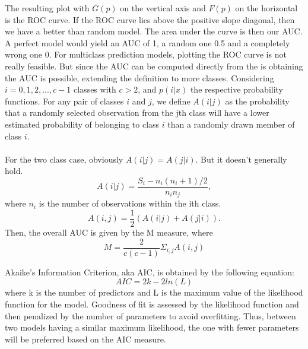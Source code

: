     The resulting plot with $G(p)$ on the vertical axis and $F(p)$ on 
    the horizontal is the ROC curve. If the ROC curve lies above the 
    positive slope diagonal, then we have a better than random model. 
    The area under the curve is then our AUC. A perfect model would 
    yield an AUC of 1, a random one 0.5 and a completely wrong one 0.
    For multiclass prediction models, plotting the ROC curve is not 
    really feasible. But since the AUC can be computed directly from the  is obtaining the AUC is possible, extending the 
    definition to more classes. Considering $i=0,1,2,...,c-1$ classes 
    with $c>2$, and $p(i|x)$ the respective probability functions. 
    For any pair of classes $i$ and $j$, we define $A(i|j)$ as the 
    probability that a randomly selected observation from the jth class 
    will have a lower estimated probability of belonging to class $i$ 
    than a randomly drawn member of class $i$.
    \\\\
    For the two class case, obviously $A(i|j) = A(j|i)$. But it 
    doesn't generally hold.
    \begin{equation}
        A(i|j)=\frac{S_i-n_i(n_i+1)/2}{n_in_j},  
    \end{equation}
    where $n_i$ is the number of observations within the ith class.
    \begin{equation}
        A(i,j) = \frac{1}{2}(A(i|j)+A(j|i)).   
    \end{equation}
    Then, the overall AUC is given by the M measure, where 
    \begin{equation}
        M=\frac{2}{c(c-1)}\Sigma_{i,j}A(i,j)
    \end{equation}
    
    
    Akaike's Information Criterion, aka AIC, is obtained by the 
    following equation:
    \begin{equation}
        AIC = 2k-2ln(L)  
    \end{equation}
    where k is the number of predictors and L is the maximum value 
    of the likelihood function for the model. Goodness of fit is 
    assessed by the likelihood function and then penalized by the 
    number of parameters to avoid overfitting. Thus, between two models 
    having a similar maximum likelihood, the one with fewer parameters 
    will be preferred based on the AIC measure.